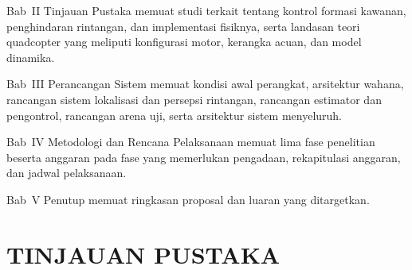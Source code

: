 \documentclass[12pt,a4paper]{report}
\begin{document}
Bab~II Tinjauan Pustaka memuat studi terkait tentang kontrol formasi kawanan, penghindaran rintangan, dan implementasi fisiknya, serta landasan teori quadcopter yang meliputi konfigurasi motor, kerangka acuan, dan model dinamika.

Bab~III Perancangan Sistem memuat kondisi awal perangkat, arsitektur wahana, rancangan sistem lokalisasi dan persepsi rintangan, rancangan estimator dan pengontrol, rancangan arena uji, serta arsitektur sistem menyeluruh.

Bab~IV Metodologi dan Rencana Pelaksanaan memuat lima fase penelitian beserta anggaran pada fase yang memerlukan pengadaan, rekapitulasi anggaran, dan jadwal pelaksanaan.

Bab~V Penutup memuat ringkasan proposal dan luaran yang ditargetkan.

\chapter{TINJAUAN PUSTAKA}
\end{document}
